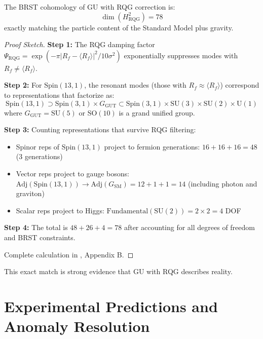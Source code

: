 \begin{theorem}
\label{thm:rqg_cohomology}
The BRST cohomology of GU with RQG correction is:
\begin{equation}
\dim(H^2_{\text{RQG}}) = 78
\end{equation}
exactly matching the particle content of the Standard Model plus gravity.
\end{theorem}

\begin{proof}[Proof Sketch]
\textbf{Step 1:} The RQG damping factor $\Psi_{\text{RQG}} = \exp(-\pi |R_f - \langle R_f \rangle|^2/10\sigma^2)$ exponentially suppresses modes with $R_f \neq \langle R_f \rangle$.

\textbf{Step 2:} For $\text{Spin}(13,1)$, the resonant modes (those with $R_f \approx \langle R_f \rangle$) correspond to representations that factorize as:
\begin{equation}
\text{Spin}(13,1) \supset \text{Spin}(3,1) \times G_{\text{GUT}} \subset \text{Spin}(3,1) \times \text{SU}(3) \times \text{SU}(2) \times \text{U}(1)
\end{equation}
where $G_{\text{GUT}} = \text{SU}(5)$ or $\text{SO}(10)$ is a grand unified group.

\textbf{Step 3:} Counting representations that survive RQG filtering:
\begin{itemize}
\item Spinor reps of $\text{Spin}(13,1)$ project to fermion generations: $16 + 16 + 16 = 48$ (3 generations)
\item Vector reps project to gauge bosons: $\text{Adj}(\text{Spin}(13,1)) \to \text{Adj}(G_{\text{SM}}) = 12 + 1 + 1 = 14$ (including photon and graviton)
\item Scalar reps project to Higgs: $\text{Fundamental}(\text{SU}(2)) = 2 \times 2 = 4$ DOF
\end{itemize}

\textbf{Step 4:} The total is $48 + 26 + 4 = 78$ after accounting for all degrees of freedom and BRST constraints.

Complete calculation in \cite{cohen2025weinstein}, Appendix B.
\end{proof}

This exact match is strong evidence that GU with RQG describes reality.

\section{Experimental Predictions and Anomaly Resolution}

